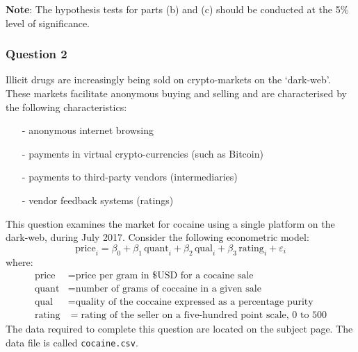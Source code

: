 \documentclass[12pt,a4paper]{article}
\begin{document}
\noindent \textbf{Note}: The hypothesis tests for parts (b) and (c)
should be conducted at the 5\% level of significance.

\subsubsection*{Question 2}

Illicit drugs are increasingly being sold on crypto-markets on the `dark-web'. These markets facilitate anonymous buying and selling and are characterised by the following characteristics:
\begin{itemize}
\item [-] anonymous internet browsing
\item [-] payments in virtual crypto-currencies (such as Bitcoin)
\item [-] payments to third-party vendors (intermediaries)
\item [-] vendor feedback systems (ratings)
\end{itemize}

\noindent This question examines the market for cocaine using a single platform on the dark-web, during July 2017. Consider the following econometric model:
\[
\mbox{price}_{i} = \beta_{0} + \beta_{1}\,\mbox{quant}_{i} + \beta_{2}\,\mbox{qual}_{i} + \beta_{3}\,\mbox{rating}_{i} + \varepsilon_{i}
\]
where:
\begin{align*}
\mbox{price } & = \mbox{price per gram in \$USD for a cocaine sale}\\
\mbox{quant} & = \mbox{number of grams of coccaine in a given sale}\\
\mbox{qual} & = \mbox{quality of the coccaine expressed as a percentage purity}\\
\mbox{rating} & = \mbox{rating of the seller on a five-hundred point scale, $0$ to $500$}
\end{align*}
The data required to complete this question are located on the
subject page. The data file is called \texttt{cocaine.csv}. \vspace{0.1in}
\end{document}
